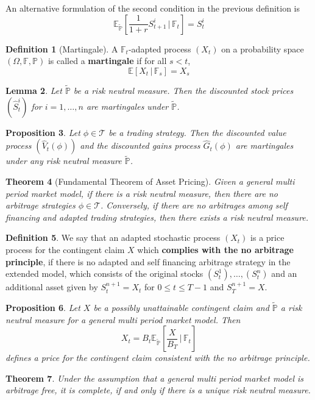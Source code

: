 \documentclass[10pt, oneside, reqno]{amsart}
\theoremstyle{plain}%
\newtheorem{thm}{Theorem}[subsection]
\newtheorem{lem}[thm]{Lemma}
\newtheorem{prop}[thm]{Proposition}
\theoremstyle{definition}
\newtheorem{defn}[thm]{Definition}
\theoremstyle{remark}
\newcommand{\expc}[1]{\mathbb{E}\left[#1\right]}
\newcommand{\expp}[1]{\mathbb{E}_{\rnm}\left[#1\right]}
\newcommand{\given}{ \, | \,}
\newcommand{\F}{\mathbb{F}}
\newcommand{\rnm}{\tilde{\mathbb{P}}}
\begin{document}
An alternative formulation of the second condition in the previous definition is \[
    \expp{\frac{1}{1+r}S^i_{t+1} \given \F_t} = S^i_t
\]

\begin{defn}[Martingale]
    A $\F_t$-adapted process $(X_t)$ on a probability space $(\Omega, \F, \mathbb{P})$ is called a \textbf{martingale} if for all $s < t$, \[
        \expc{X_t \given \F_s} = X_s
    \]
\end{defn}

\begin{lem}
    Let $\rnm$ be a risk neutral measure.  Then the discounted stock prices $(\hat{S}^i_t)$ for $i = 1,\dots,n$ are martingales under $\rnm$.
\end{lem}

\begin{prop}Let $\phi \in \mathcal{T}$ be a trading strategy.  Then the discounted value process $(\hat{V}_t(\phi))$ and the discounted gains process $\hat{G}_t(\phi)$ are martingales under any risk neutral measure $\rnm$.
    
\end{prop}

\begin{thm}[Fundamental Theorem of Asset Pricing]
    Given a general multi period market model, if there is a risk neutral measure, then there are no arbitrage strategies $\phi \in \mathcal{T}$.  Conversely, if there are no arbitrages among self financing and adapted trading strategies, then there exists a risk neutral measure.
\end{thm}

\begin{defn}We say that an adapted stochastic process $(X_t)$ is a price process for the contingent claim $X$ which \textbf{complies with the no arbitrage principle}, if there is no adapted and self financing arbitrage strategy in the extended model, which consists of the original stocks $(S_t^1),\dots,(S_t^n)$ and an additional asset given by $S^{n+1}_t = X_t$ for $0 \leq t \leq T-1$ and $S^{n+1}_T = X$. 
\end{defn}

\begin{prop}
    Let $X$ be a possibly unattainable contingent claim and $\rnm$ a risk neutral measure for a general multi period market model.  Then \[
        X_t = B_t \expp{\frac{X}{B_T} \given \F_t}
    \] defines a price for the contingent claim consistent with the no arbitrage principle.
\end{prop}

\begin{thm}
    Under the assumption that a general multi period market model is arbitrage free, it is complete, if and only if there is a unique risk neutral measure.
\end{thm}

\end{document}
